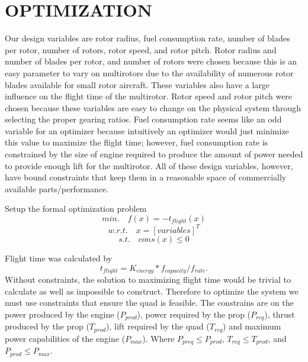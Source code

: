 \documentclass[letterpaper, 10 pt, conference]{ieeeconf}  %
\newcommand{\of}[1]{\ensuremath{\left(#1\right)}}
\begin{document}
\section{OPTIMIZATION}

Our design variables are rotor radius, fuel consumption rate, number of blades per rotor, number of rotors, rotor speed, and rotor pitch. Rotor radius and number of blades per rotor, and number of rotors were chosen because this is an easy parameter to vary on multirotors due to the availability of numerous rotor blades available for small rotor aircraft. These variables also have a large influence on the flight time of the multirotor. Rotor speed and rotor pitch were chosen because these variables are easy to change on the physical system through selecting the proper gearing ratios. Fuel consumption rate seems like an odd variable for an optimizer because intuitively an optimizer would just minimize this value to maximize the flight time; however, fuel consumption rate is constrained by the size of engine required to produce the amount of power needed to provide enough lift for the multirotor. All of these design variables, however, have bound constraints that keep them in a reasonable space of commercially available parts/performance.

Setup the formal optimization problem
\begin{equation}
min. \quad f\of{x} = -t_{flight}\of{x}
\label{eq:objective}
\end{equation}
\begin{equation}
w.r.t. \quad x = [variables]^T
\label{eq:vars}
\end{equation}
\begin{equation}
s.t. \quad cons\of{x} \leq 0 
\label{eq:constrants}
\end{equation}

Flight time was calculated by 
\begin{equation}
	t_{flight} = K_{energy}*f_{capacity}/f_{rate}.
\end{equation}
Without constraints, the solution to maximizing flight time would be trivial to calculate as well as impossible to construct. Therefore to optimize the system we must use constraints that ensure the quad is feasible. The constrains are on the power produced by the engine ($P_{prod}$), power required by the prop ($P_{req}$), thrust produced by the prop ($T_{prod}$), lift required by the quad ($T_{req}$) and maximum power capabilities of the engine ($P_{max}$). Where $P_{preq} \leq P_{prod}$, $T_{req} \leq T_{prod}$, and $P_{prod} \leq P_{max}$.
\end{document}
